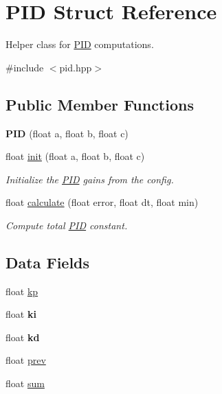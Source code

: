 \hypertarget{structPID}{}\section{P\+ID Struct Reference}
\label{structPID}


Helper class for \hyperlink{structPID}{P\+ID} computations.  




{\ttfamily \#include $<$pid.\+hpp$>$}

\subsection*{Public Member Functions}
\begin{DoxyCompactItemize}
\item 
\mbox{\label{structPID_ac5b3e2a5ad35e07517f40b8164821f8e}} 
{\bfseries P\+ID} (float a, float b, float c)
\item 
float \hyperlink{structPID_a43370ace90e60c06253f9322101e3517}{init} (float a, float b, float c)
\begin{DoxyCompactList}\small\item\em Initialize the \hyperlink{structPID}{P\+ID} gains from the config. \end{DoxyCompactList}\item 
float \hyperlink{structPID_a7d7903c58db1a8b6c63a6f40672d3765}{calculate} (float error, float dt, float min)
\begin{DoxyCompactList}\small\item\em Compute total \hyperlink{structPID}{P\+ID} constant. \end{DoxyCompactList}\end{DoxyCompactItemize}
\subsection*{Data Fields}
\begin{DoxyCompactItemize}
\item 
float \hyperlink{structPID_a9bff6d497fdd262f6f0f74a76604d22a}{kp}
\item 
\mbox{\label{structPID_af2b185d6025a735e294c3ca698562648}} 
float {\bfseries ki}
\item 
\mbox{\label{structPID_ac8f8dd4ddd347ff859db4e1dc3af90d5}} 
float {\bfseries kd}
\item 
float \hyperlink{structPID_ab1935e94bf22e1c6f8565a0677ab0871}{prev}
\item 
float \hyperlink{structPID_a04f280906a9f186e64100b3a58775a71}{sum}
\end{DoxyCompactItemize}



